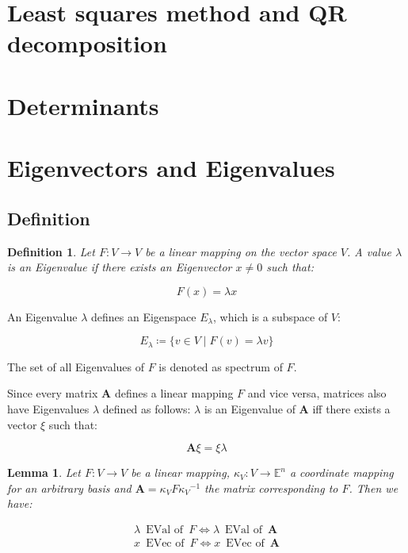 \documentclass[a4paper,12pt]{article}
\newcommand{\defas}{\coloneqq}
\newcommand{\E}{\mathbb{E}}
\newcommand{\A}{\mat{A}}
\newcommand{\Er}{E_{\lambda}}
\newcommand{\mat}[1]{\mathbf{#1}}
\newcommand{\inv}[1]{{#1}^{-1}}
\let\oldxi\xi
\renewcommand{\xi}{\mathbb{\oldxi}}
\theoremstyle{plain}
\newtheorem{defn}{Definition}[section]
\newtheorem{lemma}{Lemma}[section]
\numberwithin{equation}{section}
\begin{document}
\section{Least squares method and QR decomposition}

\section{Determinants}

\section{Eigenvectors and Eigenvalues}

\subsection{Definition}

\begin{defn}
\label{eigenvalue}
    Let $F \colon V \rightarrow V$ be a linear mapping on the vector space $V$.
    A value $\lambda$ is an Eigenvalue if there exists an Eigenvector $x \neq 0$
    such that:

    \begin{equation}
        F(x) = \lambda x
    \end{equation}
\end{defn}

An Eigenvalue $\lambda$ defines an Eigenspace $\Er$, which is a subspace
of $V$:

\begin{equation}
    \Er \defas \{ v \in V \mid F(v) = \lambda v \}
\end{equation}

The set of all Eigenvalues of $F$ is denoted as spectrum of $F$.

Since every matrix $\A$ defines a linear mapping $F$ and vice versa,
matrices also have Eigenvalues $\lambda$ defined as follows: $\lambda$ is
an Eigenvalue of $\A$ iff there exists a vector $\xi$ such that:

\begin{equation}
    \A \xi = \xi \lambda
\end{equation}

\begin{lemma}
\label{equiv-map-mat}
    Let $F \colon V \rightarrow V$ be a linear mapping,
    $\kappa_{V} \colon V \rightarrow \E^{n}$ a coordinate mapping for an
    arbitrary basis and $\A = \kappa_{V} F \inv{\kappa_{V}}$ the matrix
    corresponding to $F$. Then we have:

    \begin{equation*}
        \begin{gathered}
            \lambda \enspace \text{EVal of} \enspace F
                \iff \lambda \enspace \text{EVal of} \enspace \A \\
            x \enspace \text{EVec of} \enspace F
                \iff x \enspace \text{EVec of} \enspace \A
        \end{gathered}
    \end{equation*}
\end{lemma}
\end{document}
